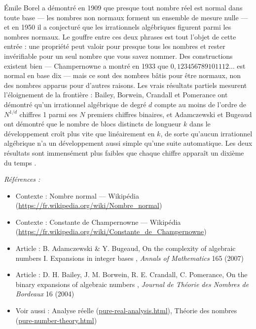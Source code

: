 \documentclass[11pt]{article}
\newenvironment{refs}{\par\small\noindent\emph{Références :}\begin{itemize}\setlength\itemsep{0pt}}{\end{itemize}\normalsize}
\begin{document}
\noindent Émile Borel a démontré en 1909 que presque tout nombre réel est normal
dans toute base --- les nombres non normaux forment un ensemble de mesure nulle --- et en 1950
il a conjecturé que les irrationnels algébriques figurent parmi les nombres normaux. Le
gouffre entre ces deux phrases est tout l'objet de cette entrée : une propriété peut valoir
pour presque tous les nombres et rester invérifiable pour un seul nombre que vous savez
nommer. Des constructions existent bien --- Champernowne a montré en 1933 que
$ 0{,}123456789101112\ldots $ est normal en base dix --- mais ce sont des nombres bâtis
pour être normaux, non des nombres apparus pour d'autres raisons. Les vrais résultats
partiels mesurent l'éloignement de la frontière : Bailey, Borwein, Crandall et Pomerance
ont démontré qu'un irrationnel algébrique de degré $ d $ compte au moins de l'ordre de
$ N^{1/d} $ chiffres 1 parmi ses $ N $ premiers chiffres binaires, et Adamczewski et
Bugeaud ont démontré que le nombre de blocs distincts de longueur $ k $ dans le
développement croît plus vite que linéairement en $ k $, de sorte qu'aucun irrationnel
algébrique n'a un développement aussi simple qu'une suite automatique. Les deux résultats
sont immensément plus faibles que \og{} chaque chiffre apparaît un dixième du temps \fg{}.

\begin{refs}
\item Contexte : Nombre normal --- Wikipédia (\url{https://fr.wikipedia.org/wiki/Nombre_normal})
\item Contexte : Constante de Champernowne --- Wikipédia (\url{https://fr.wikipedia.org/wiki/Constante_de_Champernowne})
\item Article : B. Adamczewski \& Y. Bugeaud, \og{} On the complexity of algebraic numbers I. Expansions in integer bases \fg{}, \textit{Annals of Mathematics} 165 (2007)
\item Article : D. H. Bailey, J. M. Borwein, R. E. Crandall, C. Pomerance, \og{} On the binary expansions of algebraic numbers \fg{}, \textit{Journal de Théorie des Nombres de Bordeaux} 16 (2004)
\item Voir aussi : Analyse réelle (\url{pure-real-analysis.html}), Théorie des nombres (\url{pure-number-theory.html})
\end{refs}

\bigskip
\end{document}
